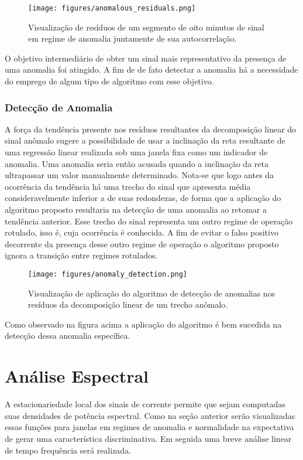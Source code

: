\begin{figure}[H]
    \centering
    \texttt{[image: figures/anomalous\_residuals.png]}
    \caption{Visualização de resíduos de um segmento de oito minutos de sinal
    em regime de anomalia juntamente de sua autocorrelação.}
    \label{fig:anomalous_residue}
\end{figure}

O objetivo intermediário de obter um sinal mais representativo da presença de
uma anomalia foi atingido. A fim de de fato detectar a anomalia há a
necessidade do emprego de algum tipo de algoritmo com esse objetivo.

\subsubsection{Detecção de Anomalia}

A força da tendência presente nos resíduos resultantes da decomposição linear
do sinal anômalo sugere a possibilidade de usar a inclinação da reta resultante
de uma regressão linear realizada sob uma janela fixa como um indicador de
anomalia. Uma anomalia seria então acusada quando a inclinação da reta
ultrapassar um valor manualmente determinado. Nota-se que logo antes da
ocorrência da tendência há uma trecho do sinal que apresenta média
consideravelmente inferior a de suas redondezas, de forma que a aplicação do
algoritmo proposto resultaria na detecção de uma anomalia ao retomar a
tendência anterior. Esse trecho do sinal representa um outro regime de operação
rotulado, isso é, cuja ocorrência é conhecida. A fim de evitar o falso positivo
decorrente da presença desse outro regime de operação o algoritmo proposto
ignora a transição entre regimes rotulados.

\begin{figure}[H]
    \centering
    \texttt{[image: figures/anomaly\_detection.png]}
    \caption{Visualização de aplicação do algoritmo de detecção de anomalias
    nos resíduos da decomposição linear de um trecho anômalo.}
    \label{fig:normal_residue}
\end{figure}

Como observado na figura acima a aplicação do algoritmo é bem sucedida na
detecção dessa anomalia específica.

\section{Análise Espectral}

A estacionariedade local dos sinais de corrente permite que sejam computadas
suas densidades de potência espectral. Como na seção anterior serão
visualizadas essas funções para janelas em regimes de anomalia e normalidade na
expectativa de gerar uma característica discriminativa. Em seguida uma breve
análise linear de tempo frequência será realizada.

